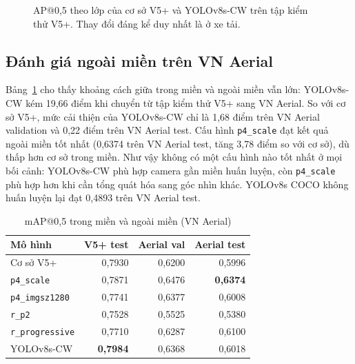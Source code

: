 \documentclass[10pt,journal,letterpaper]{IEEEtran}
\begin{document}
\begin{figure}[!t]
\centering
{}
\caption{AP@0,5 theo lớp của cơ sở V5+ và YOLOv8s-CW trên tập kiểm thử V5+. Thay đổi đáng kể duy nhất là ở xe tải.}
\label{fig:cls}
\end{figure}

\subsection{Đánh giá ngoài miền trên VN Aerial}
Bảng~\ref{tab:cd} cho thấy khoảng cách giữa trong miền và ngoài miền vẫn lớn: YOLOv8s-CW kém 19,66 điểm khi chuyển từ tập kiểm thử V5+ sang VN Aerial. So với cơ sở V5+, mức cải thiện của YOLOv8s-CW chỉ là 1,68 điểm trên VN Aerial validation và 0,22 điểm trên VN Aerial test. Cấu hình \texttt{p4\_scale} đạt kết quả ngoài miền tốt nhất (0,6374 trên VN Aerial test, tăng 3,78 điểm so với cơ sở), dù thấp hơn cơ sở trong miền. Như vậy không có một cấu hình nào tốt nhất ở mọi bối cảnh: YOLOv8s-CW phù hợp camera gần miền huấn luyện, còn \texttt{p4\_scale} phù hợp hơn khi cần tổng quát hóa sang góc nhìn khác. YOLOv8s COCO không huấn luyện lại đạt 0,4893 trên VN Aerial test.

\begin{table}[!t]
\caption{mAP@0,5 trong miền và ngoài miền (VN Aerial)}
\label{tab:cd}
\centering
\footnotesize
\begin{tabular}{lrrr}
\toprule
Mô hình & V5+ test & Aerial val & Aerial test \\
\midrule
Cơ sở V5+ & 0,7930 & 0,6200 & 0,5996 \\
\texttt{p4\_scale} & 0,7871 & 0,6476 & \textbf{0,6374} \\
\texttt{p4\_imgsz1280} & 0,7741 & 0,6377 & 0,6008 \\
\texttt{r\_p2} & 0,7528 & 0,5525 & 0,5380 \\
\texttt{r\_progressive} & 0,7710 & 0,6287 & 0,6100 \\
YOLOv8s-CW & \textbf{0,7984} & 0,6368 & 0,6018 \\
\bottomrule
\end{tabular}
\end{table}
\end{document}
